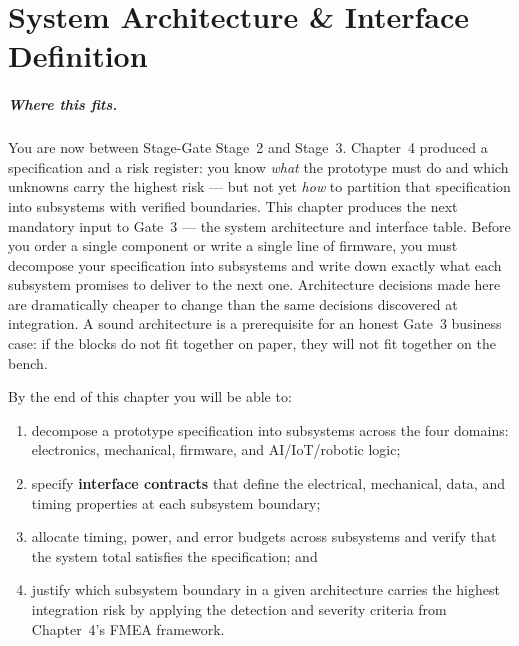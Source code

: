 
\chapter{System Architecture \& Interface Definition}
\label{ch5}

\paragraph{Where this fits.}
You are now between Stage-Gate Stage~2 and Stage~3.
Chapter~4 produced a specification and a risk register: you know \emph{what} the prototype must do and which unknowns carry the highest risk --- but not yet \emph{how} to partition that specification into subsystems with verified boundaries.
This chapter produces the next mandatory input to Gate~3 --- the system architecture and interface table.
Before you order a single component or write a single line of firmware, you must decompose your specification into subsystems and write down exactly what each subsystem promises to deliver to the next one.
Architecture decisions made here are dramatically cheaper to change than the same decisions discovered at integration.
A sound architecture is a prerequisite for an honest Gate~3 business case: if the blocks do not fit together on paper, they will not fit together on the bench.

By the end of this chapter you will be able to:
\begin{enumerate}
  \item decompose a prototype specification into subsystems across the four domains: electronics, mechanical, firmware, and AI/IoT/robotic logic;
  \item specify \textbf{interface contracts} that define the electrical, mechanical, data, and timing properties at each subsystem boundary;
  \item allocate timing, power, and error budgets across subsystems and verify that the system total satisfies the specification; and
  \item justify which subsystem boundary in a given architecture carries the highest integration risk by applying the detection and severity criteria from Chapter~4's FMEA framework.
\end{enumerate}

